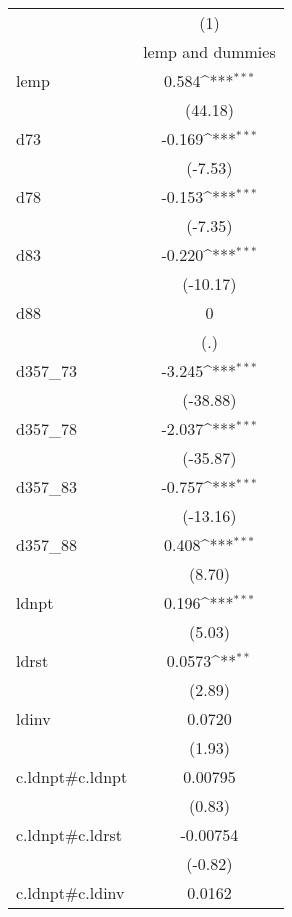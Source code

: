 {
\def\sym#1{\ifmmode^{#1}\else\(^{#1}\)\fi}
\begin{tabular}{l*{1}{c}}
\hline\hline
            &\multicolumn{1}{c}{(1)}\\
            &\multicolumn{1}{c}{lemp and dummies}\\
\hline
lemp        &       0.584\sym{***}\\
            &     (44.18)         \\
[1em]
d73         &      -0.169\sym{***}\\
            &     (-7.53)         \\
[1em]
d78         &      -0.153\sym{***}\\
            &     (-7.35)         \\
[1em]
d83         &      -0.220\sym{***}\\
            &    (-10.17)         \\
[1em]
d88         &           0         \\
            &         (.)         \\
[1em]
d357\_73     &      -3.245\sym{***}\\
            &    (-38.88)         \\
[1em]
d357\_78     &      -2.037\sym{***}\\
            &    (-35.87)         \\
[1em]
d357\_83     &      -0.757\sym{***}\\
            &    (-13.16)         \\
[1em]
d357\_88     &       0.408\sym{***}\\
            &      (8.70)         \\
[1em]
ldnpt       &       0.196\sym{***}\\
            &      (5.03)         \\
[1em]
ldrst       &      0.0573\sym{**} \\
            &      (2.89)         \\
[1em]
ldinv       &      0.0720         \\
            &      (1.93)         \\
[1em]
c.ldnpt#c.ldnpt&     0.00795         \\
            &      (0.83)         \\
[1em]
c.ldnpt#c.ldrst&    -0.00754         \\
            &     (-0.82)         \\
[1em]
c.ldnpt#c.ldinv&      0.0162         \\

\end{tabular}}
